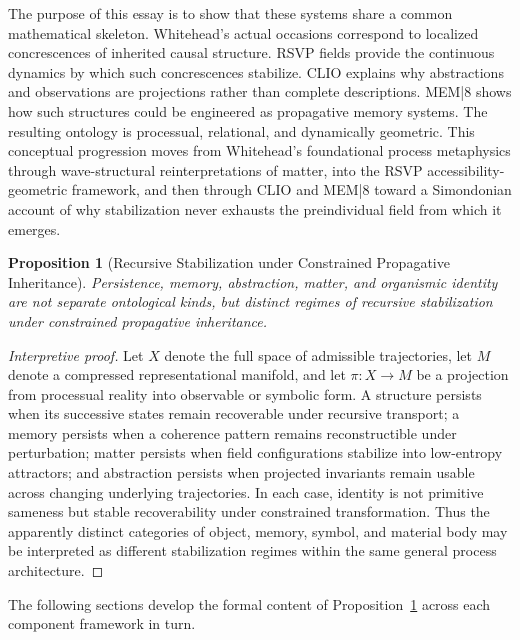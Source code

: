 \documentclass[12pt,a4paper]{article}
\newtheorem{proposition}{Proposition}
\begin{document}
The purpose of this essay is to show that these systems share a common mathematical skeleton. Whitehead's actual occasions correspond to localized concrescences of inherited causal structure. RSVP fields provide the continuous dynamics by which such concrescences stabilize. CLIO explains why abstractions and observations are projections rather than complete descriptions. MEM|8 shows how such structures could be engineered as propagative memory systems. The resulting ontology is processual, relational, and dynamically geometric. This conceptual progression moves from Whitehead's foundational process metaphysics through wave-structural reinterpretations of matter, into the RSVP accessibility-geometric framework, and then through CLIO and MEM|8 toward a Simondonian account of why stabilization never exhausts the preindividual field from which it emerges.

\bigskip

\begin{proposition}[Recursive Stabilization under Constrained Propagative Inheritance]
\label{prop:stabilization}
Persistence, memory, abstraction, matter, and organismic identity are not separate ontological kinds, but distinct regimes of recursive stabilization under constrained propagative inheritance.
\end{proposition}

\begin{proof}[Interpretive proof]
Let \(X\) denote the full space of admissible trajectories, let \(M\) denote a compressed representational manifold, and let \(\pi:X\to M\) be a projection from processual reality into observable or symbolic form. A structure persists when its successive states remain recoverable under recursive transport; a memory persists when a coherence pattern remains reconstructible under perturbation; matter persists when field configurations stabilize into low-entropy attractors; and abstraction persists when projected invariants remain usable across changing underlying trajectories. In each case, identity is not primitive sameness but stable recoverability under constrained transformation. Thus the apparently distinct categories of object, memory, symbol, and material body may be interpreted as different stabilization regimes within the same general process architecture.
\end{proof}

The following sections develop the formal content of Proposition~\ref{prop:stabilization} across each component framework in turn.
\end{document}
